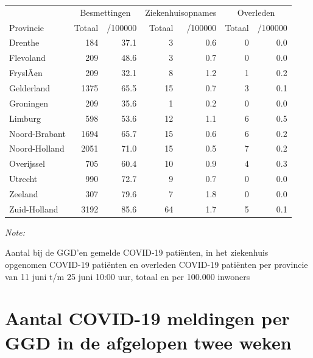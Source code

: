 \documentclass[
  english,
  man,floatsintext]{apa6}
\begin{document}
\begin{table}
\centering
\begin{threeparttable}
\begin{tabular}{lrrrrrr}
\toprule
\multicolumn{1}{c}{ } & \multicolumn{2}{c}{Besmettingen} & \multicolumn{2}{c}{Ziekenhuisopnames} & \multicolumn{2}{c}{Overleden} \\
\cmidrule(l{3pt}r{3pt}){2-3} \cmidrule(l{3pt}r{3pt}){4-5} \cmidrule(l{3pt}r{3pt}){6-7}
Provincie & Totaal & /100000 & Totaal & /100000 & Totaal & /100000\\
\midrule
Drenthe & 184 & 37.1 & 3 & 0.6 & 0 & 0.0\\
Flevoland & 209 & 48.6 & 3 & 0.7 & 0 & 0.0\\
FryslÃ¢n & 209 & 32.1 & 8 & 1.2 & 1 & 0.2\\
Gelderland & 1375 & 65.5 & 15 & 0.7 & 3 & 0.1\\
Groningen & 209 & 35.6 & 1 & 0.2 & 0 & 0.0\\
Limburg & 598 & 53.6 & 12 & 1.1 & 6 & 0.5\\
Noord-Brabant & 1694 & 65.7 & 15 & 0.6 & 6 & 0.2\\
Noord-Holland & 2051 & 71.0 & 15 & 0.5 & 7 & 0.2\\
Overijssel & 705 & 60.4 & 10 & 0.9 & 4 & 0.3\\
Utrecht & 990 & 72.7 & 9 & 0.7 & 0 & 0.0\\
Zeeland & 307 & 79.6 & 7 & 1.8 & 0 & 0.0\\
Zuid-Holland & 3192 & 85.6 & 64 & 1.7 & 5 & 0.1\\
\bottomrule
\end{tabular}
\begin{tablenotes}
\item \textit{Note: } 
\item Aantal bij de GGD’en gemelde COVID-19 patiënten, in het ziekenhuis opgenomen COVID-19 patiënten en overleden COVID-19 patiënten per provincie van 11 juni t/m 25 juni 10:00 uur, totaal en per 100.000 inwoners
\end{tablenotes}
\end{threeparttable}
\end{table}

\newpage

\hypertarget{aantal-covid-19-meldingen-per-ggd-in-de-afgelopen-twee-weken}{%
\section{Aantal COVID-19 meldingen per GGD in de afgelopen twee weken}\label{aantal-covid-19-meldingen-per-ggd-in-de-afgelopen-twee-weken}}
\end{document}
